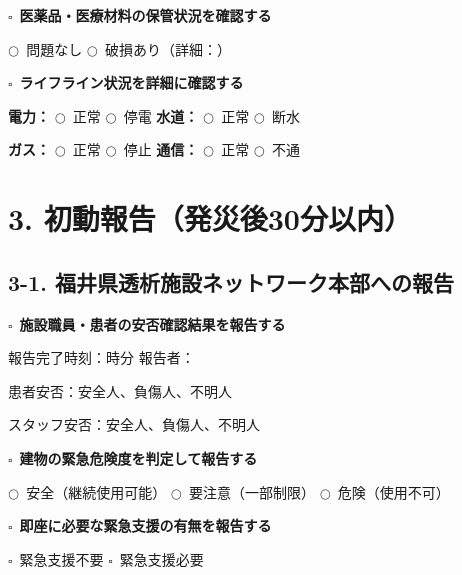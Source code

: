 \documentclass[a4paper,12pt]{jarticle}
\newcommand{\checkbox}{$\square$\ }
\newcommand{\underlinespace}[1]{\underline{\hspace{#1}}}
\newcommand{\circlecheck}{$\bigcirc$\ }
\begin{document}
\vspace{3mm}

\checkbox \textbf{医薬品・医療材料の保管状況を確認する}

\quad \circlecheck 問題なし \quad \circlecheck 破損あり（詳細：\underlinespace{6cm}）

\vspace{3mm}

\checkbox \textbf{ライフライン状況を詳細に確認する}

\quad \textbf{電力：} \circlecheck 正常 \circlecheck 停電 \quad \textbf{水道：} \circlecheck 正常 \circlecheck 断水

\quad \textbf{ガス：} \circlecheck 正常 \circlecheck 停止 \quad \textbf{通信：} \circlecheck 正常 \circlecheck 不通

\vspace{5mm}

\newpage

\section*{3. 初動報告（発災後30分以内）}

\subsection*{3-1. 福井県透析施設ネットワーク本部への報告}

\checkbox \textbf{施設職員・患者の安否確認結果を報告する}

\quad 報告完了時刻：\underlinespace{1cm}時\underlinespace{1cm}分 \quad 報告者：\underlinespace{4cm}

\quad 患者安否：安全\underlinespace{2cm}人、負傷\underlinespace{2cm}人、不明\underlinespace{2cm}人

\quad スタッフ安否：安全\underlinespace{2cm}人、負傷\underlinespace{2cm}人、不明\underlinespace{2cm}人

\vspace{4mm}

\checkbox \textbf{建物の緊急危険度を判定して報告する}

\quad \circlecheck 安全（継続使用可能） \quad \circlecheck 要注意（一部制限） \quad \circlecheck 危険（使用不可）

\vspace{4mm}

\checkbox \textbf{即座に必要な緊急支援の有無を報告する}

\quad \checkbox 緊急支援不要 \quad \checkbox 緊急支援必要
\end{document}
